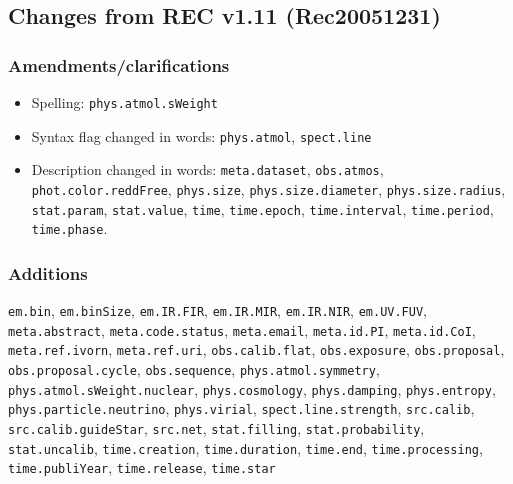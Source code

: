 \documentclass[11pt,a4paper]{ivoa}
\begin{document}
\subsection{Changes from REC v1.11 (Rec20051231)}
\subsubsection*{Amendments/clarifications}
\begin{itemize}
\item Spelling: {\tt phys.atmol.sWeight}
\item Syntax flag changed in words: {\tt phys.atmol}, {\tt spect.line}
\item \begin{flushleft}
Description changed in words: 
{\tt meta.dataset}, {\tt obs.atmos}, {\tt phot.color.reddFree}, 
{\tt phys.size}, {\tt phys.size.diameter}, {\tt phys.size.radius}, {\tt stat.param}, {\tt stat.value}, 
{\tt time}, {\tt time.epoch}, {\tt time.interval}, {\tt time.period}, {\tt time.phase}.
\end{flushleft}
\end{itemize}

\subsubsection*{Additions}
\begin{flushleft}
{\tt em.bin}, {\tt em.binSize}, {\tt em.IR.FIR}, {\tt em.IR.MIR}, {\tt em.IR.NIR}, {\tt em.UV.FUV}, 
{\tt meta.abstract}, {\tt meta.code.status}, {\tt meta.email}, {\tt meta.id.PI}, {\tt meta.id.CoI}, 
{\tt meta.ref.ivorn}, {\tt meta.ref.uri}, {\tt obs.calib.flat}, {\tt obs.exposure}, {\tt obs.proposal}, 
{\tt obs.proposal.cycle}, {\tt obs.sequence}, {\tt phys.atmol.symmetry}, {\tt phys.atmol.sWeight.nuclear}, 
{\tt phys.cosmology}, {\tt phys.damping}, {\tt phys.entropy}, {\tt phys.particle.neutrino}, {\tt phys.virial}, 
{\tt spect.line.strength}, {\tt src.calib}, {\tt src.calib.guideStar}, {\tt src.net}, {\tt stat.filling}, 
{\tt stat.probability}, {\tt stat.uncalib}, {\tt time.creation}, {\tt time.duration}, {\tt time.end}, 
{\tt time.processing}, {\tt time.publiYear}, {\tt time.release}, {\tt time.star}
\end{flushleft}
\end{document}
